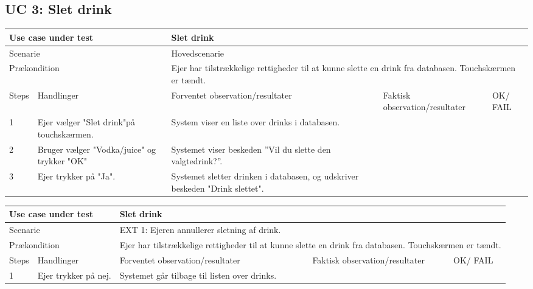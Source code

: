\subsection{UC 3: Slet drink}

\begin{table}[H]
\begin{tabular}{|p{1cm}|p{4cm}|p{4cm}|p{4cm}|p{1cm}|}
\hline
\multicolumn{2}{|p{5cm}|}{Use case under test} & \multicolumn{3}{p{9cm}|}{Slet drink}                                       \\ \hline
\multicolumn{2}{|p{5cm}|}{Scenarie}            & \multicolumn{3}{p{9cm}|}{Hovedscenarie}                                          \\ \hline
\multicolumn{2}{|p{5cm}|}{Prækondition}        & \multicolumn{3}{p{9cm}|}{Ejer har tilstrækkelige rettigheder til at kunne slette en drink fra databasen. Touchskærmen er tændt.}                                 \\ \hline
Steps               & Handlinger          & Forventet observation/resultater & Faktisk observation/resultater & OK/ FAIL \\ \hline
1    & Ejer vælger "Slet drink"på touchskærmen.  & System viser en liste over drinks i databasen. &   &         \\ \hline
2    & Bruger vælger "Vodka/juice" og trykker "OK"  & Systemet viser beskeden ”Vil du slette den valgtedrink?”.  &   &         \\ \hline
3    & Ejer trykker på "Ja".  & Systemet sletter drinken i databasen, og udskriver beskeden "Drink slettet".  &   &         \\ \hline

\end{tabular}
\end{table}

\begin{table}[H]
\begin{tabular}{|p{1cm}|p{4cm}|p{4cm}|p{4cm}|p{1cm}|}
\hline
\multicolumn{2}{|p{5cm}|}{Use case under test} & \multicolumn{3}{p{9cm}|}{Slet drink}                                       \\ \hline
\multicolumn{2}{|p{5cm}|}{Scenarie}            & \multicolumn{3}{p{9cm}|}{EXT 1: Ejeren annullerer sletning af drink.}                                          \\ \hline
\multicolumn{2}{|p{5cm}|}{Prækondition}        & \multicolumn{3}{p{9cm}|}{Ejer  har  tilstrækkelige  rettigheder  til  at  kunne  slette  en drink fra databasen. Touchskærmen er tændt.}                                 \\ \hline
Steps               & Handlinger          & Forventet observation/resultater & Faktisk observation/resultater & OK/ FAIL \\ \hline
1    & Ejer trykker på nej.  & Systemet går tilbage til listen over drinks. &   &      \\ \hline


\end{tabular}
\end{table}


